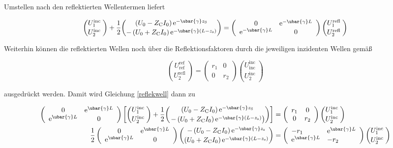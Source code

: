 Umstellen nach den reflektierten Wellentermen liefert

\begin{equation}\label{reflekwell}
	\binom{U_{1}^{\text {inc }}}{U_{2}^{\text {inc }}}+\frac{1}{2}\binom{\left(U_{0}-Z_{\mathrm{C}} I_{0}\right) \mathrm{e}^{-\ubar{\gamma} z_{\mathrm{S}}}}{-\left(U_{0}+Z_{\mathrm{C}} I_{0}\right) \mathrm{e}^{-\ubar{\gamma}\left(L-z_{\mathrm{s}}\right)}}=\left(\begin{array}{cc}
		0 & \mathrm{e}^{-\ubar{\gamma} L}  \\
		\mathrm{e}^{-\ubar{\gamma} L} & 0
	\end{array}\right)\binom{U_{1}^{\text {refl }}}{U_{2}^{\text {refl }}}
\end{equation}

Weiterhin können die reflektierten Wellen noch über die Reflektionsfaktoren durch die jeweiligen inzidenten Wellen gemäß

\begin{equation}
	\binom{U_{\text {ref }}^{\text {ref }}}{U_{2}^{\text {refl }}}=\left(\begin{array}{cc}
		r_{1} & 0  \\
		0 & r_{2}
	\end{array}\right)\binom{U_{\text {inc }}^{\text {inc }}}{U_{2}^{\text {inc }}}
\end{equation}

ausgedrückt werden. Damit wird Gleichung \ref{reflekwell} dann zu


\begin{align}
	\left(\begin{array}{cc}
		0 & \mathrm{e}^{\ubar{\gamma} L} \\
		\mathrm{e}^{\ubar{\gamma} L} & 0
	\end{array}\right)\left[\binom{U_{1}^{\text {inc }}}{U_{2}^{\text {inc }}}+\frac{1}{2}\binom{\left(U_{0}-Z_{\mathrm{C}} I_{0}\right) \mathrm{e}^{-\ubar{\gamma} z_{\mathrm{S}}}}{\left.-\left(U_{0}+Z_{\mathrm{C}} I_{0}\right) \mathrm{e}^{-\ubar{\gamma}\left(L-z_{\mathrm{s}}\right)}\right)}\right] & =\left(\begin{array}{cc}
		r_{1} & 0 \\
		0 & r_{2}
	\end{array}\right)\binom{U_{1}^{\text {inc }}}{U_{2}^{\text {inc }}} \\
	\frac{1}{2}\left(\begin{array}{cc}
		0 & \mathrm{e}^{\ubar{\gamma} L} \\
		\mathrm{e}^{\ubar{\gamma} L} & 0
	\end{array}\right)\binom{-\left(U_{0}-Z_{\mathrm{C}} I_{0}\right) \mathrm{e}^{-\ubar{\gamma} z_{\mathrm{s}}}}{\left(U_{0}+Z_{\mathrm{C}} I_{0}\right) \mathrm{e}^{-\ubar{\gamma}\left(L-z_{\mathrm{s}}\right)}} & =\left(\begin{array}{ll}
		-r_{1} & \mathrm{e}^{\ubar{\gamma} L} \\
		\mathrm{e}^{\ubar{\gamma} L} & -r_{2}
	\end{array}\right)\binom{U_{1}^{\text {inc }}}{U_{2}^{\text {inc }}} 
\end{align}


